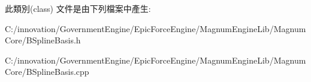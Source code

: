 此類別(class) 文件是由下列檔案中產生\+:\begin{DoxyCompactItemize}
\item 
C\+:/innovation/\+Government\+Engine/\+Epic\+Force\+Engine/\+Magnum\+Engine\+Lib/\+Magnum\+Core/B\+Spline\+Basis.\+h\item 
C\+:/innovation/\+Government\+Engine/\+Epic\+Force\+Engine/\+Magnum\+Engine\+Lib/\+Magnum\+Core/B\+Spline\+Basis.\+cpp\end{DoxyCompactItemize}
